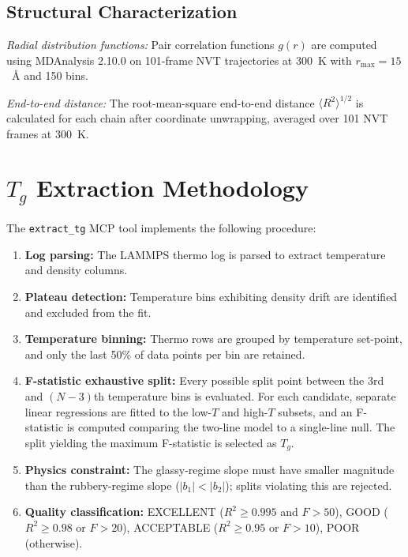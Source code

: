 \documentclass[journal=acsami,manuscript=suppinfo]{achemso}
\begin{document}
\subsection{Structural Characterization}

\emph{Radial distribution functions:} Pair correlation functions $g(r)$ are computed using MDAnalysis 2.10.0 on 101-frame NVT trajectories at 300~K with $r_{\max} = 15$~\AA{} and 150 bins.

\emph{End-to-end distance:} The root-mean-square end-to-end distance $\langle R^2 \rangle^{1/2}$ is calculated for each chain after coordinate unwrapping, averaged over 101 NVT frames at 300~K.


\section{$T_g$ Extraction Methodology}
\label{sec:si_tg_method}

The \texttt{extract\_tg} MCP tool implements the following procedure:

\begin{enumerate}
    \item \textbf{Log parsing:} The LAMMPS thermo log is parsed to extract temperature and density columns.
    \item \textbf{Plateau detection:} Temperature bins exhibiting density drift are identified and excluded from the fit.
    \item \textbf{Temperature binning:} Thermo rows are grouped by temperature set-point, and only the last 50\% of data points per bin are retained.
    \item \textbf{F-statistic exhaustive split:} Every possible split point between the 3rd and $(N-3)$th temperature bins is evaluated.
    For each candidate, separate linear regressions are fitted to the low-$T$ and high-$T$ subsets, and an F-statistic is computed comparing the two-line model to a single-line null.
    The split yielding the maximum F-statistic is selected as $T_g$.
    \item \textbf{Physics constraint:} The glassy-regime slope must have smaller magnitude than the rubbery-regime slope ($|b_1| < |b_2|$); splits violating this are rejected.
    \item \textbf{Quality classification:} EXCELLENT ($R^2 \geq 0.995$ and $F > 50$), GOOD ($R^2 \geq 0.98$ or $F > 20$), ACCEPTABLE ($R^2 \geq 0.95$ or $F > 10$), POOR (otherwise).
\end{enumerate}
\end{document}
